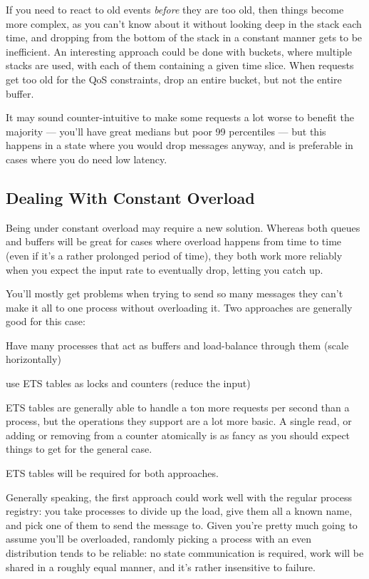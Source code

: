 If you need to react to old events \emph{before} they are too old, then things become more complex, as you can't know about it without looking deep in the stack each time, and dropping from the bottom of the stack in a constant manner gets to be inefficient. An interesting approach could be done with buckets, where multiple stacks are used, with each of them containing a given time slice. When requests get too old for the QoS constraints, drop an entire bucket, but not the entire buffer.

It may sound counter-intuitive to make some requests a lot worse to benefit the majority — you'll have great medians but poor 99 percentiles — but this happens in a state where you would drop messages anyway, and is preferable in cases where you do need low latency.

\subsection{Dealing With Constant Overload}

Being under constant overload may require a new solution. Whereas both queues and buffers will be great for cases where overload happens from time to time (even if it's a rather prolonged period of time), they both work more reliably when you expect the input rate to eventually drop, letting you catch up.

You'll mostly get problems when trying to send so many messages they can't make it all to one process without overloading it. Two approaches are generally good for this case:

\begin{itemize*}
	\item Have many processes that act as buffers and load-balance through them (scale horizontally)
	\item use ETS tables as locks and counters (reduce the input)
\end{itemize*}

ETS tables are generally able to handle a ton more requests per second than a process, but the operations they support are a lot more basic. A single read, or adding or removing from a counter atomically is as fancy as you should expect things to get for the general case.

ETS tables will be required for both approaches.

Generally speaking, the first approach could work well with the regular process registry: you take  processes to divide up the load, give them all a known name, and pick one of them to send the message to. Given you're pretty much going to assume you'll be overloaded, randomly picking a process with an even distribution tends to be reliable: no state communication is required, work will be shared in a roughly equal manner, and it's rather insensitive to failure.

